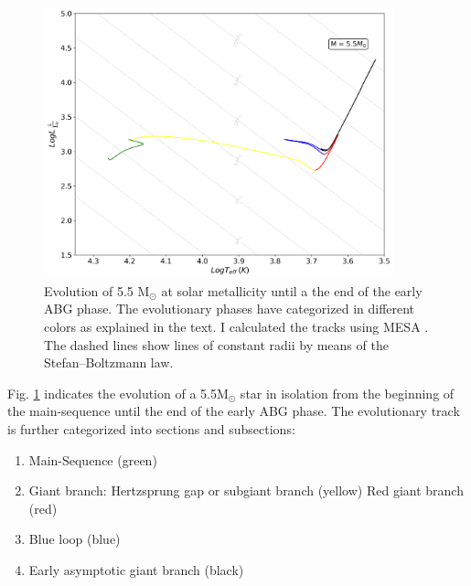 \begin{figure}[H]
    \centering
    \includegraphics[width=0.9\textwidth]{Thesis/graphs/HR_evolution.pdf}
    \caption{Evolution of 5.5 M$_{\odot}$ at solar metallicity until a the end of the early ABG phase. The evolutionary phases have categorized in different colors as explained in the text. I calculated the tracks using MESA \citep{paxton2010modules,paxton2013modules,paxton2015modules,paxton2019modules}. The dashed lines show lines of constant radii by means of the Stefan–Boltzmann law.}
    \label{fig:HR_evolution}
\end{figure}
Fig. \ref{fig:HR_evolution} indicates the evolution of a 5.5M$_{\odot}$ star in isolation from the beginning of the main-sequence until the end of the early ABG phase. The evolutionary track is further categorized into sections and subsections: 
\begin{enumerate}
    \item Main-Sequence (green)
    \item Giant branch: 
        \subitem Hertzsprung gap or subgiant branch (yellow) 
        \subitem Red giant branch (red)
    \item Blue loop (blue)
    \item Early asymptotic giant branch (black)
\end{enumerate}
